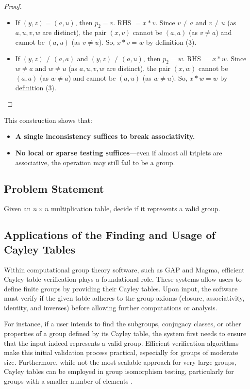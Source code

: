 \documentclass[sigconf]{acmart}
\begin{document}
\begin{proof}
\begin{itemize}
\begin{itemize}
    \end{itemize}
    \item If $(y,z) = (a,u)$, then $p_2 = v$. RHS $= x \ast v$.
    Since $v \neq a$ and $v \neq u$ (as $a,u,v,w$ are distinct), the pair $(x,v)$ cannot be $(a,a)$ (as $v \neq a$) and cannot be $(a,u)$ (as $v \neq u$). So, $x \ast v = w$ by definition (3).
    \item If $(y,z) \neq (a,a)$ and $(y,z) \neq (a,u)$, then $p_2 = w$. RHS $= x \ast w$.
    Since $w \neq a$ and $w \neq u$ (as $a,u,v,w$ are distinct), the pair $(x,w)$ cannot be $(a,a)$ (as $w \neq a$) and cannot be $(a,u)$ (as $w \neq u$). So, $x \ast w = w$ by definition (3).
\end{itemize}

\end{proof}

This construction shows that:
\begin{itemize}
    \item \textbf{A single inconsistency suffices to break associativity.}
    \item \textbf{No local or sparse testing suffices}—even if almost all triplets are associative, the operation may still fail to be a group.
\end{itemize}

\subsection{Problem Statement}
Given an \( n \times n \) multiplication table, decide if it represents a valid group.

\subsection{Applications of the Finding and Usage of Cayley Tables}

Within computational group theory software, such as GAP and Magma, efficient Cayley table verification plays a foundational role.
These systems allow users to define finite groups by providing their Cayley tables.
Upon input, the software must verify if the given table adheres to the group axioms (closure, associativity, identity, and inverses)
before allowing further computations or analysis. 

For instance, if a user intends to find the subgroups, conjugacy classes, or
other properties of a group defined by its Cayley table, the system first needs to ensure that the input indeed represents a valid group. 
Efficient verification algorithms make this initial validation process practical, especially for groups of moderate size. 
Furthermore, while not the most scalable approach for very large groups, Cayley tables can be employed in group isomorphism 
testing, particularly for groups with a smaller number of elements \cite{williams2015group}.
\end{document}
